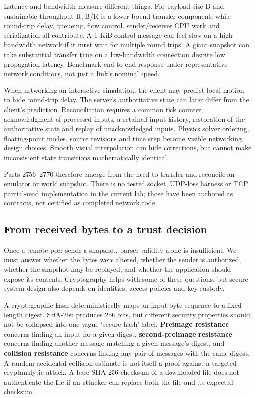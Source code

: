 Latency and bandwidth measure different things. For payload size B and sustainable throughput R, B/R is a lower-bound transfer component, while round-trip delay, queueing, flow control, sender/receiver CPU work and serialization all contribute. A 1-KiB control message can feel slow on a high-bandwidth network if it must wait for multiple round trips. A giant snapshot can take substantial transfer time on a low-bandwidth connection despite low propagation latency. Benchmark end-to-end response under representative network conditions, not just a link's nominal speed.

When networking an interactive simulation, the client may predict local motion to hide round-trip delay. The server's authoritative state can later differ from the client's prediction. Reconciliation requires a common tick counter, acknowledgment of processed inputs, a retained input history, restoration of the authoritative state and replay of unacknowledged inputs. Physics solver ordering, floating-point modes, source revisions and time step become visible networking design choices. Smooth visual interpolation can hide corrections, but cannot make inconsistent state transitions mathematically identical.

Parts 2756--2770 therefore emerge from the need to transfer and reconcile an emulator or world snapshot. There is no tested socket, UDP-loss harness or TCP partial-read implementation in the current lab; those have been authored as contracts, not certified as completed network code.

\subsection{From received bytes to a trust decision}\label{from-received-bytes-to-a-trust-decision}

Once a remote peer sends a snapshot, parser validity alone is insufficient. We must answer whether the bytes were altered, whether the sender is authorized, whether the snapshot may be replayed, and whether the application should expose its contents. Cryptography helps with some of these questions, but secure system design also depends on identities, access policies and key custody.

A cryptographic hash deterministically maps an input byte sequence to a fixed-length digest. SHA-256 produces 256 bits, but different security properties should not be collapsed into one vague `secure hash' label. \textbf{Preimage resistance} concerns finding an input for a given digest, \textbf{second-preimage resistance} concerns finding another message matching a given message's digest, and \textbf{collision resistance} concerns finding any pair of messages with the same digest. A random accidental collision estimate is not itself a proof against a targeted cryptanalytic attack. A bare SHA-256 checksum of a downloaded file does not authenticate the file if an attacker can replace both the file and its expected checksum.

